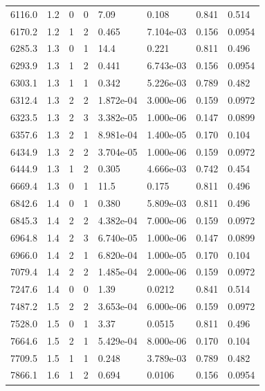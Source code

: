 \documentclass[preview]{standalone}
\begin{document}
{{{\begin{tabular}{L{1.2cm}C{1.2cm} C{0.3cm}C{0.5cm} C{1.4cm}C{1.4cm} C{1.4cm}C{1.4cm}}
  6116.0  &   1.2  & 0     &  0 &  7.09  & 0.108  & 0.841 &  0.514   \\ 
  6170.2  &   1.2  & 1     &  2 &  0.465  & 7.104e-03  & 0.156 &  0.0954   \\ 
  6285.3  &   1.3  & 0     &  1 &  14.4  & 0.221  & 0.811 &  0.496   \\ 
  6293.9  &   1.3  & 1     &  2 &  0.441  & 6.743e-03  & 0.156 &  0.0954   \\ 
  6303.1  &   1.3  & 1     &  1 &  0.342  & 5.226e-03  & 0.789 &  0.482   \\ 
  6312.4  &   1.3  & 2     &  2 &  1.872e-04  & 3.000e-06  & 0.159 &  0.0972   \\ 
  6323.5  &   1.3  & 2     &  3 &  3.382e-05  & 1.000e-06  & 0.147 &  0.0899   \\ 
  6357.6  &   1.3  & 2     &  1 &  8.981e-04  & 1.400e-05  & 0.170 &  0.104   \\ 
  6434.9  &   1.3  & 2     &  2 &  3.704e-05  & 1.000e-06  & 0.159 &  0.0972   \\ 
  6444.9  &   1.3  & 1     &  2 &  0.305  & 4.666e-03  & 0.742 &  0.454   \\ 
  6669.4  &   1.3  & 0     &  1 &  11.5  & 0.175  & 0.811 &  0.496   \\ 
  6842.6  &   1.4  & 0     &  1 &  0.380  & 5.809e-03  & 0.811 &  0.496   \\ 
  6845.3  &   1.4  & 2     &  2 &  4.382e-04  & 7.000e-06  & 0.159 &  0.0972   \\ 
  6964.8  &   1.4  & 2     &  3 &  6.740e-05  & 1.000e-06  & 0.147 &  0.0899   \\ 
  6966.0  &   1.4  & 2     &  1 &  6.820e-04  & 1.000e-05  & 0.170 &  0.104   \\ 
  7079.4  &   1.4  & 2     &  2 &  1.485e-04  & 2.000e-06  & 0.159 &  0.0972   \\ 
  7247.6  &   1.4  & 0     &  0 &  1.39  & 0.0212  & 0.841 &  0.514   \\ 
  7487.2  &   1.5  & 2     &  2 &  3.653e-04  & 6.000e-06  & 0.159 &  0.0972   \\ 
  7528.0  &   1.5  & 0     &  1 &  3.37  & 0.0515  & 0.811 &  0.496   \\ 
  7664.6  &   1.5  & 2     &  1 &  5.429e-04  & 8.000e-06  & 0.170 &  0.104   \\ 
  7709.5  &   1.5  & 1     &  1 &  0.248  & 3.789e-03  & 0.789 &  0.482   \\ 
  7866.1  &   1.6  & 1     &  2 &  0.694  & 0.0106  & 0.156 &  0.0954   \\ 

\end{tabular}}}}
\end{document}
